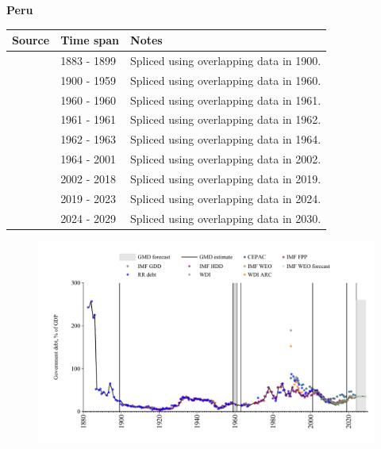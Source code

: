 \documentclass[12pt,a4paper,landscape]{article}
\begin{document}
\begin{adjustbox}{max totalsize={\paperwidth}{\paperheight},center}
\begin{minipage}[t][\textheight][t]{\textwidth}
\vspace*{0.5cm}
{}
\begin{center}
{\Large\bfseries Peru}
\end{center}
\vspace{0.5cm}
\begin{table}[H]
\centering
\small
\begin{tabular}{|l|l|l|}
\hline
\textbf{Source} & \textbf{Time span} & \textbf{Notes} \\
\hline
\rowcolor{white}\cite{RR_debt}& 1883 - 1899 &Spliced using overlapping data in 1900.\\
\rowcolor{lightgray}\cite{IMF_FPP}& 1900 - 1959 &Spliced using overlapping data in 1960.\\
\rowcolor{white}\cite{RR_debt}& 1960 - 1960 &Spliced using overlapping data in 1961.\\
\rowcolor{lightgray}\cite{IMF_FPP}& 1961 - 1961 &Spliced using overlapping data in 1962.\\
\rowcolor{white}\cite{RR_debt}& 1962 - 1963 &Spliced using overlapping data in 1964.\\
\rowcolor{lightgray}\cite{IMF_FPP}& 1964 - 2001 &Spliced using overlapping data in 2002.\\
\rowcolor{white}\cite{IMF_GDD}& 2002 - 2018 &Spliced using overlapping data in 2019.\\
\rowcolor{lightgray}\cite{IMF_FPP}& 2019 - 2023 &Spliced using overlapping data in 2024.\\
\rowcolor{white}\cite{IMF_WEO_forecast}& 2024 - 2029 &Spliced using overlapping data in 2030.\\
\hline
\end{tabular}
\end{table}
\begin{figure}[H]
\centering
\includegraphics[width=\textwidth,height=0.6\textheight,keepaspectratio]{graphs/PER_govdebt_GDP.pdf}
\end{figure}
\end{minipage}
\end{adjustbox}
\end{document}
